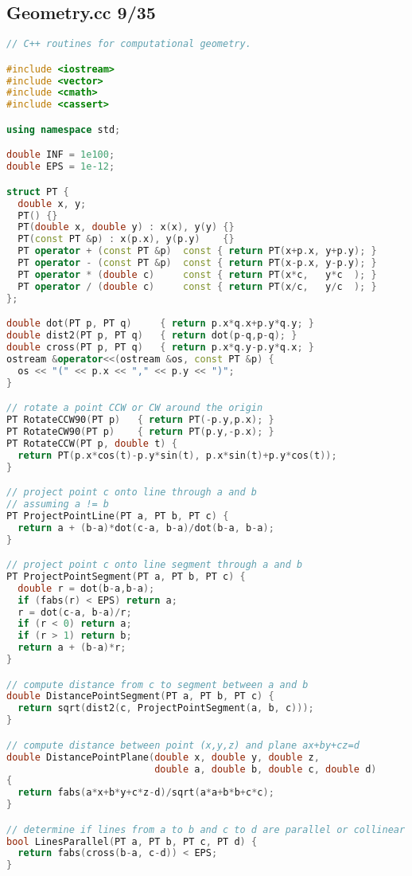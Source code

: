 \subsection{Geometry.cc 9/35}
\begin{lstlisting}[language=C++]
// C++ routines for computational geometry.

#include <iostream>
#include <vector>
#include <cmath>
#include <cassert>

using namespace std;

double INF = 1e100;
double EPS = 1e-12;

struct PT { 
  double x, y; 
  PT() {}
  PT(double x, double y) : x(x), y(y) {}
  PT(const PT &p) : x(p.x), y(p.y)    {}
  PT operator + (const PT &p)  const { return PT(x+p.x, y+p.y); }
  PT operator - (const PT &p)  const { return PT(x-p.x, y-p.y); }
  PT operator * (double c)     const { return PT(x*c,   y*c  ); }
  PT operator / (double c)     const { return PT(x/c,   y/c  ); }
};

double dot(PT p, PT q)     { return p.x*q.x+p.y*q.y; }
double dist2(PT p, PT q)   { return dot(p-q,p-q); }
double cross(PT p, PT q)   { return p.x*q.y-p.y*q.x; }
ostream &operator<<(ostream &os, const PT &p) {
  os << "(" << p.x << "," << p.y << ")"; 
}

// rotate a point CCW or CW around the origin
PT RotateCCW90(PT p)   { return PT(-p.y,p.x); }
PT RotateCW90(PT p)    { return PT(p.y,-p.x); }
PT RotateCCW(PT p, double t) { 
  return PT(p.x*cos(t)-p.y*sin(t), p.x*sin(t)+p.y*cos(t)); 
}

// project point c onto line through a and b
// assuming a != b
PT ProjectPointLine(PT a, PT b, PT c) {
  return a + (b-a)*dot(c-a, b-a)/dot(b-a, b-a);
}

// project point c onto line segment through a and b
PT ProjectPointSegment(PT a, PT b, PT c) {
  double r = dot(b-a,b-a);
  if (fabs(r) < EPS) return a;
  r = dot(c-a, b-a)/r;
  if (r < 0) return a;
  if (r > 1) return b;
  return a + (b-a)*r;
}

// compute distance from c to segment between a and b
double DistancePointSegment(PT a, PT b, PT c) {
  return sqrt(dist2(c, ProjectPointSegment(a, b, c)));
}

// compute distance between point (x,y,z) and plane ax+by+cz=d
double DistancePointPlane(double x, double y, double z,
                          double a, double b, double c, double d)
{
  return fabs(a*x+b*y+c*z-d)/sqrt(a*a+b*b+c*c);
}

// determine if lines from a to b and c to d are parallel or collinear
bool LinesParallel(PT a, PT b, PT c, PT d) { 
  return fabs(cross(b-a, c-d)) < EPS; 
}


\end{lstlisting}
